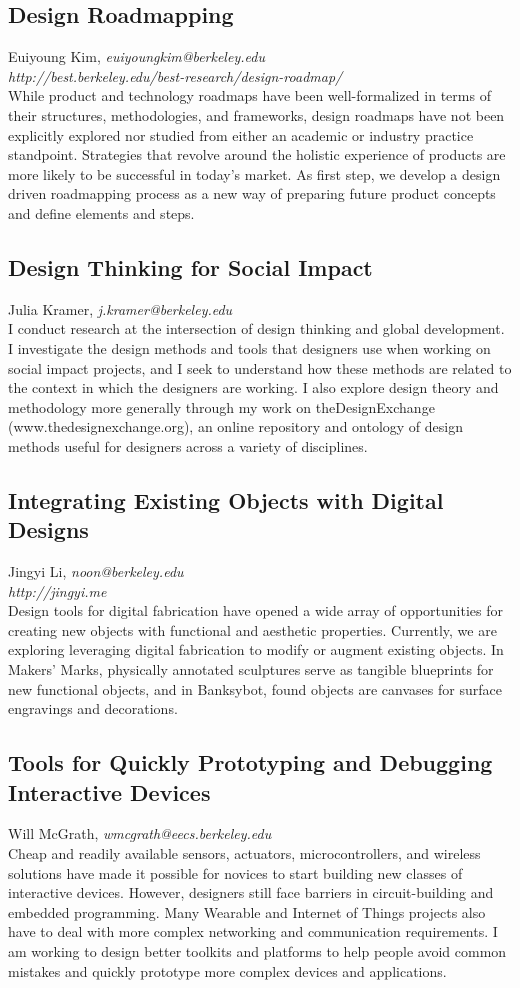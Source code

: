 \documentclass[foldmark,10pt,a4paper,notumble]{leaflet}
\newcommand{\name}[1]{#1,}
\newcommand{\email}[1]{\emph{#1}}
\newcommand{\website}[1]{\\\emph{#1}\\[3pt]}
\newcommand{\nowebsite}[1]{\\[3pt]}
\begin{document}
\subsection{Design Roadmapping}
\name{Euiyoung Kim}
\email{euiyoungkim@berkeley.edu}
\website{http://best.berkeley.edu/best-research/design-roadmap/}
While product and technology roadmaps have been well-formalized in terms of their structures, methodologies, and frameworks, design roadmaps have not been explicitly explored nor studied from either an academic or industry practice standpoint. Strategies that revolve around the holistic experience of products are more likely to be successful in today’s market. As first step, we develop a design driven roadmapping process as a new way of preparing future product concepts and define elements and steps.

\subsection{Design Thinking for Social Impact}
\name{Julia Kramer}
\email{j.kramer@berkeley.edu}
\nowebsite{}
I conduct research at the intersection of design thinking and global development. I investigate the design methods and tools that designers use when working on social impact projects, and I seek to understand how these methods are related to the context in which the designers are working. I also explore design theory and methodology more generally through my work on theDesignExchange (www.thedesignexchange.org), an online repository and ontology of design methods useful for designers across a variety of disciplines.

\subsection{Integrating Existing Objects with Digital Designs}
\name{Jingyi Li}
\email{noon@berkeley.edu}
\website{http://jingyi.me}
Design tools for digital fabrication have opened a wide array of opportunities for creating new objects with functional and aesthetic properties. Currently, we are exploring leveraging digital fabrication to modify or augment existing objects. In Makers’ Marks, physically annotated sculptures serve as tangible blueprints for new functional objects, and in Banksybot, found objects are canvases for surface engravings and decorations.

\subsection{Tools for Quickly Prototyping and Debugging Interactive Devices}
\name{Will McGrath}
\email{wmcgrath@eecs.berkeley.edu}
\nowebsite{}
Cheap and readily available sensors, actuators, microcontrollers, and wireless solutions have made it possible for novices to start building new classes of interactive devices. However, designers still face barriers in circuit-building and embedded programming. Many Wearable and Internet of Things projects also have to deal with more complex networking and communication requirements. I am working to design better toolkits and platforms to help people avoid common mistakes and quickly prototype more complex devices and applications.
\end{document}

